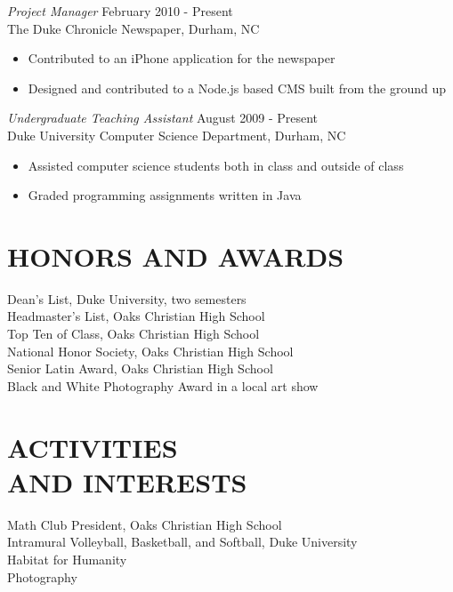 \documentclass[line,margin]{res}
\begin{document}
\begin{resume}
    {\sl Project Manager} \hfill February 2010 - Present \\
        The Duke Chronicle Newspaper, Durham, NC
        \begin{itemize}  \itemsep -2pt %
            \item Contributed to an iPhone application for the newspaper
            \item Designed and contributed to a Node.js based CMS built from the ground up
        \end{itemize}

    {\sl Undergraduate Teaching Assistant} \hfill August 2009 - Present \\
        Duke University Computer Science Department, Durham, NC
        \begin{itemize}  \itemsep -2pt %
            \item Assisted computer science students both in class and outside of class
            \item Graded programming assignments written in Java
        \end{itemize}
                

\section{HONORS AND AWARDS}
    Dean's List, Duke University, two semesters \\
    Headmaster's List, Oaks Christian High School \\
    Top Ten of Class, Oaks Christian High School \\
    National Honor Society, Oaks Christian High School \\
    Senior Latin Award, Oaks Christian High School \\
    Black and White Photography Award in a local art show

\section{ACTIVITIES \\ AND INTERESTS}             
    Math Club President, Oaks Christian High School \\
    Intramural Volleyball, Basketball, and Softball, Duke University \\
    Habitat for Humanity \\
    Photography
\end{resume}
\end{document}
